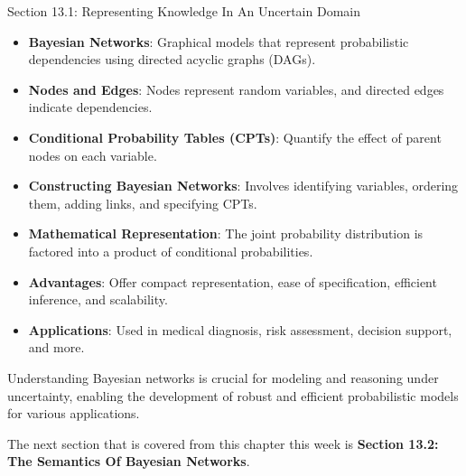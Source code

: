 \begin{notes}{Section 13.1: Representing Knowledge In An Uncertain Domain}
\begin{highlight}
        \begin{itemize}
            \item \textbf{Bayesian Networks}: Graphical models that represent probabilistic dependencies using directed acyclic graphs (DAGs).
            \item \textbf{Nodes and Edges}: Nodes represent random variables, and directed edges indicate dependencies.
            \item \textbf{Conditional Probability Tables (CPTs)}: Quantify the effect of parent nodes on each variable.
            \item \textbf{Constructing Bayesian Networks}: Involves identifying variables, ordering them, adding links, and specifying CPTs.
            \item \textbf{Mathematical Representation}: The joint probability distribution is factored into a product of conditional probabilities.
            \item \textbf{Advantages}: Offer compact representation, ease of specification, efficient inference, and scalability.
            \item \textbf{Applications}: Used in medical diagnosis, risk assessment, decision support, and more.
        \end{itemize}
    
        Understanding Bayesian networks is crucial for modeling and reasoning under uncertainty, enabling the development of robust and efficient probabilistic models for various applications.
    
    \end{highlight}
\end{notes}

The next section that is covered from this chapter this week is \textbf{Section 13.2: The Semantics Of Bayesian Networks}.

